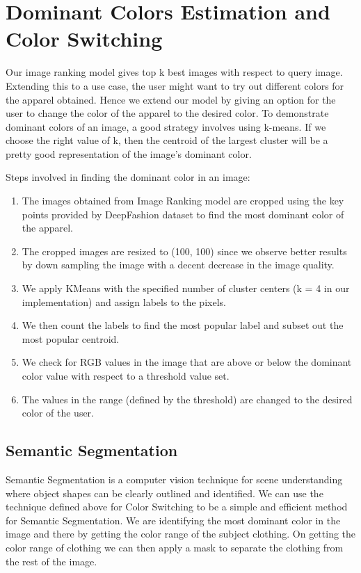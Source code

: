 \section{Dominant Colors Estimation and Color Switching}

Our image ranking model gives top k best images with respect to query image. Extending this to a use case, the user might want to try out different colors for the apparel obtained. Hence we extend our model by giving an option for the user to change the color of the apparel to the desired color. To demonstrate dominant colors of an image, a good strategy involves using k-means. If we choose the right value of k, then the centroid of the largest cluster will be a pretty good representation of the image's dominant color. \newline

Steps involved in finding the dominant color in an image:
\begin{enumerate}
     \item The images obtained from Image Ranking model are cropped using the key points provided by DeepFashion dataset to find the most dominant color of the apparel.
    \item The cropped images are resized to (100, 100) since we observe better results by down sampling the image with a decent decrease in the image quality.
    \item We apply KMeans with the specified number of cluster centers (k = 4 in our implementation) and assign labels to the pixels.
    \item We then count the labels to find the most popular label and subset out the most popular centroid.
    \item We check for RGB values in the image that are above or below the dominant color value with respect to a threshold value set.
    \item The values in the range (defined by the threshold) are changed to the desired color of the user.
    
\end{enumerate}


\subsection{Semantic Segmentation }
Semantic Segmentation is a computer vision technique for scene understanding where object shapes can be clearly outlined and identified. We can use the technique defined above for Color Switching to be a simple and efficient method for Semantic Segmentation. We are identifying the most dominant color in the image and there by getting the color range of the subject clothing. On getting the color range of clothing we can then apply a mask to separate the clothing from the rest of the image.



